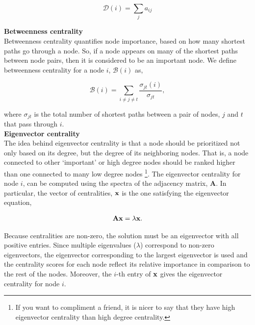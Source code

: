 \begin{equation}
\mathcal{D}(i)=\sum_{j}a_{ij}
\end{equation}

{\bf Betweenness centrality}\\
Betweenness centrality quantifies node importance, based on how many shortest paths go through a node. So, if a node appears on many of the shortest paths between node pairs, then it is considered to be an important node. We define betweenness centrality for a node $i$, $\mathcal{B}(i)$ as,

\begin{equation}
\mathcal{B}(i)=\sum_{i\ne j\ne t} \frac{\sigma_{jt}(i)}{\sigma_{jt}},
\end{equation}

where $\sigma_{jt}$ is the total number of shortest paths between a pair of nodes, $j$ and $t$ that pass through $i$. \\

{\bf Eigenvector centrality}\\
The idea behind eigenvector centrality is that a node should be prioritized not only based on its degree, but the degree of its neighboring nodes. That is, a node connected to other `important' or high degree nodes should be ranked higher than one connected to many low degree nodes \footnote{If you want to compliment a friend, it is nicer to say that they have high eigenvector centrality than high degree centrality.}. The eigenvector centrality for node $i$, can be computed using the spectra of the adjacency matrix, ${\boldsymbol A}$. In particular, the vector of centralities, ${\bf x}$ is the one satisfying the eigenvector equation,

\begin{equation}
{\bf A}{\bf x}=\lambda{\bf x}.
\end{equation}

Because centralities are non-zero, the solution must be an eigenvector with all positive entries. Since multiple eigenvalues ($\lambda$) correspond to non-zero eigenvectors, the eigenvector corresponding to the largest eigenvector is used and the centrality scores for each node reflect its relative importance in comparison to the rest of the nodes. Moreover, the $i$-th entry of ${\bf x}$ gives the eigenvector centrality for node $i$. \\

